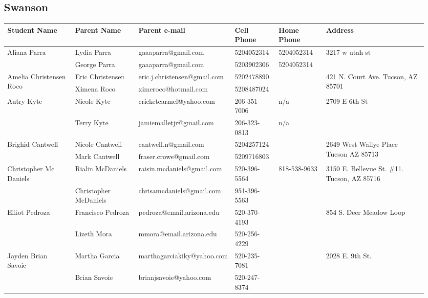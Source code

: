 \documentclass[landscape]{article}\usepackage[]{graphicx}\usepackage[]{color}
\begin{document}
\subsection{Swanson}
\begin{longtable}{|p{100pt}|p{100pt}|p{140pt}|p{60pt}|p{64pt}|p{120pt}|}
\textbf{Student Name} & \textbf{Parent Name} & \textbf{Parent e-mail} & \textbf{Cell Phone} & \textbf{Home Phone} & \textbf{Address}\\
\hline
\hline
\multirow{2}{100pt}{Aliana Parra} & Lydia Parra & gaaaparra@gmail.com & 5204052314 & 5204052314 & \multirow{2}{120pt}{3217 w utah st} \\
 & George Parra & gaaaparra@gmail.com & 5203902306 & 5204052314 & \\
\hline
\multirow{2}{100pt}{Amelia Christensen Roco} & Eric Christensen & eric.j.christensen@gmail.com & 5202478890 &  & \multirow{2}{120pt}{421 N. Court Ave. Tucson, AZ 85701} \\
 & Ximena Roco & ximeroco@hotmail.com & 5208487024 &  & \\
\hline
\multirow{2}{100pt}{Autry Kyte} & Nicole Kyte & cricketcarmel@yahoo.com & 206-351-7006 & n/a & \multirow{2}{120pt}{2709 E 6th St} \\
 & Terry Kyte & jamiemalletjr@gmail.com & 206-323-0813 & n/a & \\
\hline
\multirow{2}{100pt}{Brighid Cantwell} & Nicole Cantwell & cantwell.n@gmail.com & 5204257124 &  & \multirow{2}{120pt}{2649 West Wallye Place Tucson AZ 85713} \\
 & Mark Cantwell & fraser.crowe@gmail.com & 5209716803 &  & \\
\hline
\multirow{2}{100pt}{Christopher Mc Daniels} & Rialin McDaniels & raisin.mcdaniels@gmail.com & 520-396-5564 & 818-538-9633 & \multirow{2}{120pt}{3150 E. Bellevue St. \#11. Tucson, AZ 85716} \\
 & Christopher McDaniels & chrisamcdaniels@gmail.com & 951-396-5563 &  & \\
\hline
\multirow{2}{100pt}{Elliot Pedroza} & Francisco Pedroza & pedroza@email.arizona.edu & 520-370-4193 &  & \multirow{2}{120pt}{854 S. Deer Meadow Loop} \\
 & Lizeth Mora & mmora@email.arizona.edu & 520-256-4229 &  & \\
\hline
\multirow{2}{100pt}{Jayden Brian Savoie} & Martha Garcia & marthagarciakiky@yahoo.com & 520-235-7081 &  & \multirow{2}{120pt}{2028 E. 9th St.} \\
 & Brian Savoie & brianjsavoie@yahoo.com & 520-247-8374 &  & \\

\end{longtable}
\end{document}
